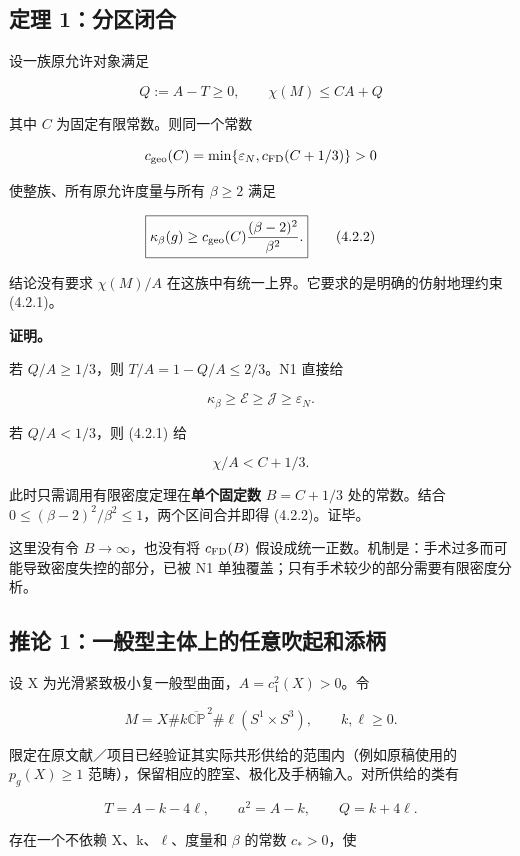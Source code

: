 \documentclass[UTF8,11pt,fontset=none]{ctexart}
\theoremstyle{definition}
\theoremstyle{remark}
\begin{document}
\subsection{定理 1：分区闭合}\label{v4-ux5b9aux7406-1ux5206ux533aux95edux5408}

设一族原允许对象满足

\[
Q:=A-T\ge0,\qquad \chi(M)\le C A+Q
\tag{4.2.1}
\]

其中 \(C\) 为固定有限常数。则同一个常数

\[
c_{\rm geo}(C)=\min\{\varepsilon_N,c_{\rm FD}(C+1/3)\}>0
\]

使整族、所有原允许度量与所有 \(\beta\ge2\) 满足

\[
\boxed{\kappa_\beta(g)\ge
c_{\rm geo}(C)\frac{(\beta-2)^2}{\beta^2}.}
\tag{4.2.2}
\]

结论没有要求 \(\chi(M)/A\) 在这族中有统一上界。它要求的是明确的仿射地理约束 (4.2.1)。

\textbf{证明。}

若 \(Q/A\ge1/3\)，则 \(T/A=1-Q/A\le2/3\)。N1 直接给

\[
\kappa_\beta\ge\mathcal E\ge\mathcal J\ge\varepsilon_N.
\]

若 \(Q/A<1/3\)，则 (4.2.1) 给

\[
\chi/A<C+1/3.
\]

此时只需调用有限密度定理在\textbf{单个固定数} \(B=C+1/3\) 处的常数。结合 \(0\le(\beta-2)^2/\beta^2\le1\)，两个区间合并即得 (4.2.2)。证毕。

这里没有令 \(B\to\infty\)，也没有将 \(c_{\rm FD}(B)\) 假设成统一正数。机制是：手术过多而可能导致密度失控的部分，已被 N1 单独覆盖；只有手术较少的部分需要有限密度分析。

\subsection{推论 1：一般型主体上的任意吹起和添柄}\label{v4-ux63a8ux8bba-1ux4e00ux822cux578bux4e3bux4f53ux4e0aux7684ux4efbux610fux5439ux8d77ux548cux6dfbux67c4}

设 X 为光滑紧致极小复一般型曲面，\(A=c_1^2(X)>0\)。令

\[
M=X\#k\overline{\mathbb{CP}}^{\,2}
\#\ell(S^1\times S^3),\qquad k,\ell\ge0.
\]

限定在原文献／项目已经验证其实际共形供给的范围内（例如原稿使用的 \(p_g(X)\ge1\) 范畴），保留相应的腔室、极化及手柄输入。对所供给的类有

\[
T=A-k-4\ell,\qquad a^2=A-k,\qquad Q=k+4\ell.
\]

存在一个不依赖 X、k、\(\ell\)、度量和 \(\beta\) 的常数 \(c_*>0\)，使
\end{document}
